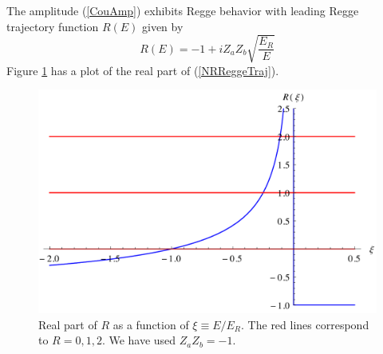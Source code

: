 The amplitude (\ref{CouAmp}) exhibits Regge behavior with leading Regge trajectory function $R(E)$ given by
\begin{equation}
	R(E) = -1 + i Z_{a} Z_{b} \sqrt{\frac{E_{R}}{E}} \label{NRReggeTraj}
\end{equation}
Figure \ref{ReNRFig} has a plot of the real part of (\ref{NRReggeTraj}).

\begin{figure}
\centering
\includegraphics[scale=0.6]{Plots/ReNR.pdf}
\caption[Real part of the Regge trajectory function for the instantaneous scalar exchange model]{Real part of $R$ as a function of $\xi \equiv E / E_{R}$. The red lines correspond to $R = 0, 1, 2$. We have used $Z_{a} Z_{b} = -1$.}
\label{ReNRFig}
\end{figure}